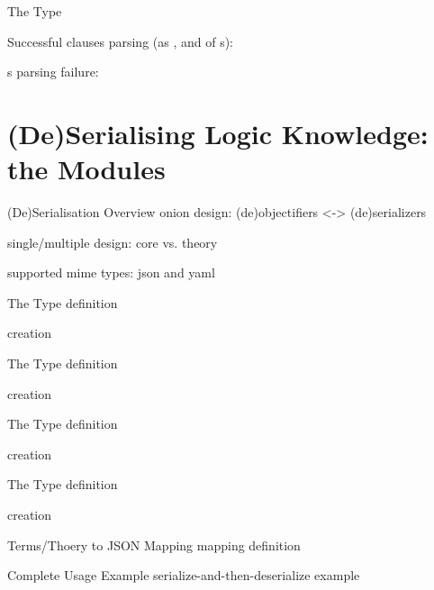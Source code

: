 \documentclass[handout]{beamer}
\begin{document}
\begin{frame}[allowframebreaks]{The  Type}
    \framebreak

    Successful clauses parsing (as ,  and  of s):

    \framebreak

    s parsing failure:

\end{frame}

\section{(De)Serialising Logic Knowledge: the  Modules}

\begin{frame}[allowframebreaks]{(De)Serialisation Overview}
    onion design: (de)objectifiers <-> (de)serializers

    single/multiple design: core vs. theory

    supported mime types: json and yaml
\end{frame}

\begin{frame}[allowframebreaks]{The  Type}
    definition

    creation
\end{frame}

\begin{frame}[allowframebreaks]{The  Type}
    definition

    creation
\end{frame}

\begin{frame}[allowframebreaks]{The  Type}
    definition

    creation
\end{frame}

\begin{frame}[allowframebreaks]{The  Type}
    definition

    creation
\end{frame}

\begin{frame}[allowframebreaks]{Terms/Thoery to JSON Mapping}
    mapping definition
\end{frame}

\begin{frame}[allowframebreaks]{Complete Usage Example}
    serialize-and-then-deserialize example
\end{frame}
\end{document}
